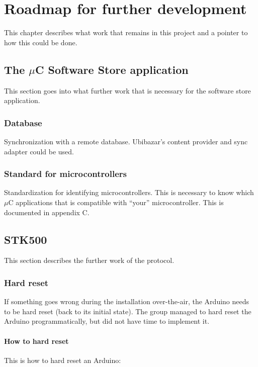 \chapter{Roadmap for further development}
This chapter describes what work that remains in this project and a pointer to how this could be done.

\section{The $\mu$C Software Store application}
This section goes into what further work that is necessary for the software store application.

	\subsection{Database}
	Synchronization with a remote database. Ubibazar's content provider and sync adapter could be used.

	\subsection{Standard for microcontrollers}
	Standardization for identifying microcontrollers. This is necessary to know which $\mu$C applications that is compatible with ``your'' microcontroller. This is documented in appendix C.

\section{STK500}
This section describes the further work of the protocol.

	\subsection{Hard reset}
	If something goes wrong during the installation over-the-air, the Arduino needs to be hard reset (back to its initial state).
	The group managed to hard reset the Arduino programmatically, but did not have time to implement it.

		\subsubsection{How to hard reset}
		This is how to hard reset an Arduino:
		